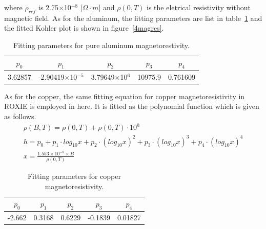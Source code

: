 where $\rho_{ref}$ is 2.75$\times$10$^{-8}$ [$\Omega\cdot m$] and $\rho(0, T)$ is the eletrical resistivity without magnetic field.
As for the aluminum, the fitting parameters are list in table~\ref{almag} and the fitted Kohler plot is shown in figure~\ref{4magres}.
\begin{table}[H]
 \centering
 \begin{tabular}{ccccc} \hline \hline
  $p_0$ & $p_1$ & $p_2$ & $p_3$ & $p_4$ \\ \hline
  3.62857 & -2.90419$\times$10$^{-5}$ & 3.79649$\times$10$^6$ & 10975.9 & 0.761609 \\ \hline \hline
 \end{tabular}
 \caption{Fitting parameters for pure aluminum magnetorestivity.}
 \label{almag}
\end{table}

As for the copper, the same fitting equation for copper magnetoresistivity in ROXIE is employed in here.
It is fitted as the polynomial function which is given as follows.
\begin{gather}
 \rho(B, T) = \rho(0, T) + \rho(0, T) \cdot 10^h \nonumber \\
 h = p_0 + p_1 \cdot log_{10}x + p_2 \cdot (log_{10}x)^2 + p_3 \cdot (log_{10}x)^3 + p_4 \cdot (log_{10}x)^4 \nonumber \\
 x = \frac{1.553\times 10^{-8} \times B}{\rho(0, T)} \nonumber 
\end{gather}
\begin{table}[H]
 \centering
 \begin{tabular}{ccccc} \hline \hline
  $p_0$ & $p_1$ & $p_2$ & $p_3$ & $p_4$ \\ \hline
  -2.662 & 0.3168 & 0.6229 & -0.1839 & 0.01827 \\ \hline \hline
 \end{tabular}
 \caption{Fitting parameters for copper magnetoresistivity.}
 \label{cumag}
\end{table}

